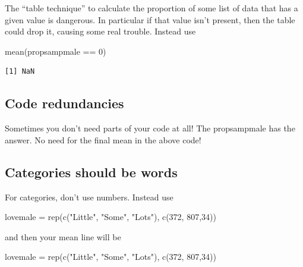 \documentclass[
  letterpaper,
  DIV=11,
  numbers=noendperiod]{scrreprt}
\newenvironment{Shaded}{\begin{snugshade}}{\end{snugshade}}
\newcommand{\DecValTok}[1]{\textcolor[rgb]{0.25,0.63,0.44}{#1}}
\newcommand{\FunctionTok}[1]{\textcolor[rgb]{0.02,0.16,0.49}{#1}}
\newcommand{\NormalTok}[1]{\textcolor[rgb]{0.00,0.44,0.13}{#1}}
\newcommand{\OtherTok}[1]{\textcolor[rgb]{0.00,0.44,0.13}{#1}}
\newcommand{\SpecialCharTok}[1]{\textcolor[rgb]{0.25,0.44,0.63}{#1}}
\newcommand{\StringTok}[1]{\textcolor[rgb]{0.25,0.44,0.63}{#1}}
\begin{document}
The ``table technique'' to calculate the proportion of some list of data
that has a given value is dangerous. In particular if that value isn't
present, then the table could drop it, causing some real trouble.
Instead use

\begin{Shaded}
\begin{Highlighting}[]
\FunctionTok{mean}\NormalTok{(propsampmale }\SpecialCharTok{==} \DecValTok{0}\NormalTok{)}
\end{Highlighting}
\end{Shaded}

\begin{verbatim}
[1] NaN
\end{verbatim}

\hypertarget{code-redundancies}{%
\subsection{Code redundancies}\label{code-redundancies}}

Sometimes you don't need parts of your code at all! The propsampmale has
the answer. No need for the final mean in the above code!

\hypertarget{categories-should-be-words}{%
\subsection{Categories should be
words}\label{categories-should-be-words}}

For categories, don't use numbers. Instead use

\begin{Shaded}
\begin{Highlighting}[]
\NormalTok{lovemale }\OtherTok{=} \FunctionTok{rep}\NormalTok{(}\FunctionTok{c}\NormalTok{(}\StringTok{"Little"}\NormalTok{, }\StringTok{"Some"}\NormalTok{, }\StringTok{"Lots"}\NormalTok{), }\FunctionTok{c}\NormalTok{(}\DecValTok{372}\NormalTok{, }\DecValTok{807}\NormalTok{,}\DecValTok{34}\NormalTok{))}
\end{Highlighting}
\end{Shaded}

and then your mean line will be

\begin{Shaded}
\begin{Highlighting}[]
\NormalTok{lovemale }\OtherTok{=} \FunctionTok{rep}\NormalTok{(}\FunctionTok{c}\NormalTok{(}\StringTok{"Little"}\NormalTok{, }\StringTok{"Some"}\NormalTok{, }\StringTok{"Lots"}\NormalTok{), }\FunctionTok{c}\NormalTok{(}\DecValTok{372}\NormalTok{, }\DecValTok{807}\NormalTok{,}\DecValTok{34}\NormalTok{))}
\end{Highlighting}
\end{Shaded}
\end{document}

